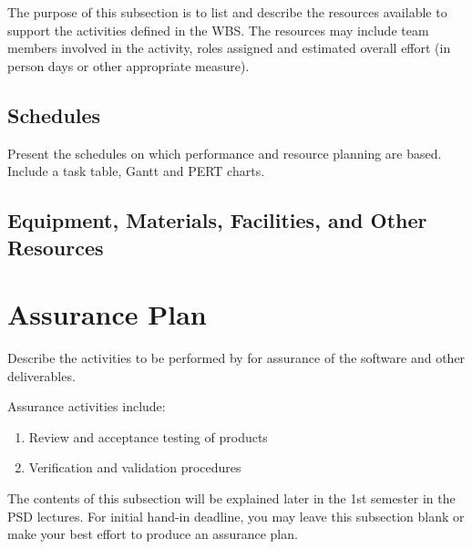 \documentclass{l3deliverable}
\begin{document}
{\begin{table}[ht]
\begin{tabular}{|c |c |c |c |c |}
\hline %
\end{tabular}
\label{table:nonlin} %
\end{table}

The purpose of this subsection is to list and describe the resources
available to support the activities defined in the WBS. The resources
may include team members involved in the activity, roles assigned and
estimated overall effort (in person days or other appropriate
measure).


\subsection{Schedules}

Present the schedules on which performance and resource planning are
based. Include a task table, Gantt and PERT charts.


\subsection{Equipment, Materials, Facilities, and Other Resources}


\section{Assurance Plan}

Describe the activities to be performed by for assurance of the
software and other deliverables.

Assurance activities include:
\begin{enumerate}
\item Review and acceptance testing of products
\item Verification and validation procedures
\end{enumerate}

The contents of this subsection will be explained later in the 1st
semester in the PSD lectures. For initial hand-in deadline, you may
leave this subsection blank or make your best effort to produce an
assurance plan.


}
\end{document}
